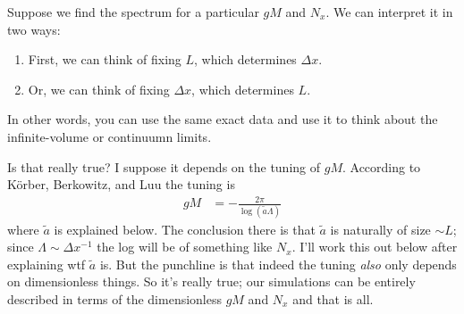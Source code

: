 Suppose we find the spectrum for a particular $gM$ and $N_x$.
We can interpret it in two ways:
\begin{enumerate}
	\item First, we can think of fixing $L$, which determines $\Delta x$.
	\item Or, we can think of fixing $\Delta x$, which determines $L$.
\end{enumerate}
In other words, you can use the same exact data and use it to think about the infinite-volume or continuumn limits.

Is that really true?  I suppose it depends on the tuning of $gM$.
According to K\"{o}rber, Berkowitz, and Luu the tuning is
\begin{align}
	gM &= - \frac{2\pi}{\log(\tilde{a} \Lambda)}
	\label{eq:tuning}
\end{align}
where $\tilde{a}$ is explained below.
The conclusion there is that $\tilde{a}$ is naturally of size $\sim L$; since $\Lambda\sim \Delta x^{-1}$ the log will be of something like $N_x$.
I'll work this out below after explaining wtf $\tilde{a}$ is.
But the punchline is that indeed the tuning \emph{also} only depends on dimensionless things.
So it's really true; our simulations can be entirely described in terms of the dimensionless $gM$ and $N_x$ and that is all.
